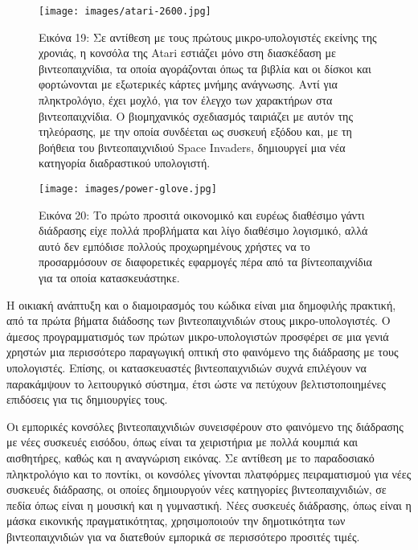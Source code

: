 \documentclass[
]{article}
\begin{document}
\leavevmode{}%
\begin{figure}
\hypertarget{fig:atari-2600}{%
\centering
\texttt{[image: images/atari-2600.jpg]}
\caption{Εικόνα 19: Σε αντίθεση με τους πρώτους μικρο-υπολογιστές
εκείνης της χρονιάς, η κονσόλα της Atari εστιάζει μόνο στη διασκέδαση με
βιντεοπαιχνίδια, τα οποία αγοράζονται όπως τα βιβλία και οι δίσκοι και
φορτώνονται με εξωτερικές κάρτες μνήμης ανάγνωσης. Αντί για
πληκτρολόγιο, έχει μοχλό, για τον έλεγχο των χαρακτήρων στα
βιντεοπαιχνίδια. Ο βιομηχανικός σχεδιασμός ταιριάζει με αυτόν της
τηλεόρασης, με την οποία συνδέεται ως συσκευή εξόδου και, με τη βοήθεια
του βιντεοπαιχνιδιού Space Invaders, δημιουργεί μια νέα κατηγορία
διαδραστικού υπολογιστή.}\label{fig:atari-2600}
}
\end{figure}

\leavevmode{}%
\begin{figure}
\hypertarget{fig:power-glove}{%
\centering
\texttt{[image: images/power-glove.jpg]}
\caption{Εικόνα 20: Το πρώτο προσιτά οικονομικό και ευρέως διαθέσιμο
γάντι διάδρασης είχε πολλά προβλήματα και λίγο διαθέσιμο λογισμικό, αλλά
αυτό δεν εμπόδισε πολλούς προχωρημένους χρήστες να το προσαρμόσουν σε
διαφορετικές εφαρμογές πέρα από τα βίντεοπαιχνίδια για τα οποία
κατασκευάστηκε.}\label{fig:power-glove}
}
\end{figure}

Η οικιακή ανάπτυξη και ο διαμοιρασμός του κώδικα είναι μια δημοφιλής
πρακτική, από τα πρώτα βήματα διάδοσης των βιντεοπαιχνιδιών στους
μικρο-υπολογιστές. Ο άμεσος προγραμματισμός των πρώτων μικρο-υπολογιστών
προσφέρει σε μια γενιά χρηστών μια περισσότερο παραγωγική οπτική στο
φαινόμενο της διάδρασης με τους υπολογιστές. Επίσης, οι κατασκευαστές
βιντεοπαιχνιδιών συχνά επιλέγουν να παρακάμψουν το λειτουργικό σύστημα,
έτσι ώστε να πετύχουν βελτιστοποιημένες επιδόσεις για τις δημιουργίες
τους.

Οι εμπορικές κονσόλες βιντεοπαιχνιδιών συνεισφέρουν στο φαινόμενο της
διάδρασης με νέες συσκευές εισόδου, όπως είναι τα χειριστήρια με πολλά
κουμπιά και αισθητήρες, καθώς και η αναγνώριση εικόνας. Σε αντίθεση με
το παραδοσιακό πληκτρολόγιο και το ποντίκι, οι κονσόλες γίνονται
πλατφόρμες πειραματισμού για νέες συσκευές διάδρασης, οι οποίες
δημιουργούν νέες κατηγορίες βιντεοπαιχνιδιών, σε πεδία όπως είναι η
μουσική και η γυμναστική. Νέες συσκευές διάδρασης, όπως είναι η μάσκα
εικονικής πραγματικότητας, χρησιμοποιούν την δημοτικότητα των
βιντεοπαιχνιδιών για να διατεθούν εμπορικά σε περισσότερο προσιτές
τιμές.
\end{document}
